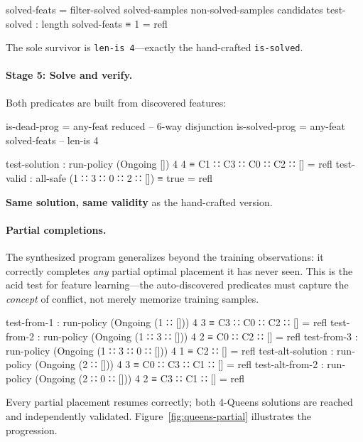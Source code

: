 \begin{spec}
solved-feats = filter-solved solved-samples non-solved-samples candidates
test-solved : length solved-feats ≡ 1    = refl
\end{spec}

\noindent The sole survivor is \texttt{len-is~4}---exactly the hand-crafted \texttt{is-solved}.

\paragraph{Stage 5: Solve and verify.}  Both predicates are built from discovered features:

\begin{spec}
is-dead-prog  = any-feat reduced       -- 6-way disjunction
is-solved-prog = any-feat solved-feats  -- len-is 4
\end{spec}

\begin{spec}
test-solution : run-policy (Ongoing []) 4 4
  ≡ C1 ∷ C3 ∷ C0 ∷ C2 ∷ []              = refl
test-valid : all-safe (1 ∷ 3 ∷ 0 ∷ 2 ∷ []) ≡ true    = refl
\end{spec}

\noindent \textbf{Same solution, same validity} as the hand-crafted version.

\paragraph{Partial completions.}
The synthesized program generalizes beyond the training observations: it correctly completes \emph{any} partial optimal placement it has never seen.
This is the acid test for feature learning---the auto-discovered predicates must capture the \emph{concept} of conflict, not merely memorize training samples.

\begin{spec}
test-from-1 : run-policy (Ongoing (1 ∷ [])) 4 3
  ≡ C3 ∷ C0 ∷ C2 ∷ []                        = refl
test-from-2 : run-policy (Ongoing (1 ∷ 3 ∷ [])) 4 2
  ≡ C0 ∷ C2 ∷ []                              = refl
test-from-3 : run-policy (Ongoing (1 ∷ 3 ∷ 0 ∷ [])) 4 1
  ≡ C2 ∷ []                                   = refl
test-alt-solution : run-policy (Ongoing (2 ∷ [])) 4 3
  ≡ C0 ∷ C3 ∷ C1 ∷ []                        = refl
test-alt-from-2 : run-policy (Ongoing (2 ∷ 0 ∷ [])) 4 2
  ≡ C3 ∷ C1 ∷ []                              = refl
\end{spec}

\noindent Every partial placement resumes correctly; both 4-Queens solutions are reached and independently validated.  Figure~\ref{fig:queens-partial} illustrates the progression.

